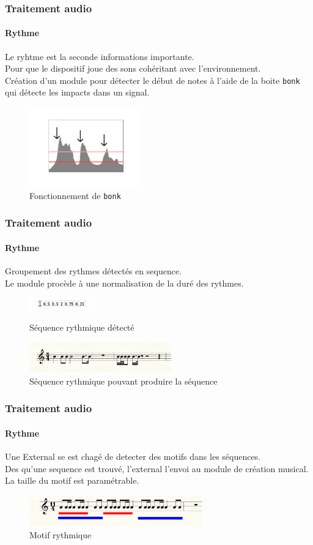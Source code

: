 \documentclass{beamer}
\begin{document}
\begin{frame}
\frametitle{Traitement audio}
\framesubtitle{Rythme}
Le ryhtme est la seconde informations importante.\\
Pour que le dispositif joue des sons cohéritant avec l’environnement.\\
Création d'un module pour détecter le début de notes à l'aide de la boite \texttt{bonk} qui détecte les impacts dans un signal.

\begin{figure}
\centering
\includegraphics[height=130px]{bonk.jpg}
\caption{Fonctionnement de \texttt{bonk}}
\end{figure}
\end{frame}


\begin{frame}
\frametitle{Traitement audio}
\framesubtitle{Rythme}
Groupement des rythmes détectés en sequence.\\
Le module procède à une normalisation de la duré des rythmes.
\begin{figure}
\centering
\includegraphics[height=20px]{rythme.jpg}
\caption{Séquence rythmique détecté}
\includegraphics[height=50px]{structurerythme.jpg}
\caption{Séquence rythmique pouvant produire la séquence}
\end{figure}
\end{frame}

\begin{frame}
\frametitle{Traitement audio}
\framesubtitle{Rythme}
Une External se est chagé de detecter des motifs dans les séquences.\\
Des qu'une sequence est trouvé, l'external l'envoi au module de création musical.\\
La taille du motif est paramétrable.
\begin{figure}
\centering
\includegraphics[height=50px]{motifrythme.jpg}
\caption{Motif rythmique}
\end{figure}
\end{frame}
\end{document}

